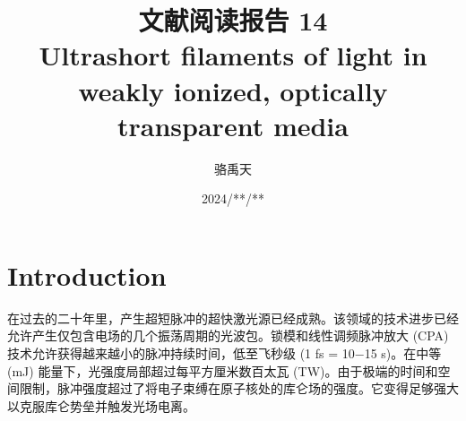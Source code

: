 \documentclass[14pt,a4paper,oneside]{article}
\title{\textbf{文献阅读报告 14\\Ultrashort filaments of light in weakly ionized, optically transparent media}\cite{bergeUltrashortFilamentsLight2007}}                           %
\author{骆禹天}                                           %
\date{2024/**/**}                                        %
\begin{document}

\maketitle

\setcounter{page}{1}          %


\tableofcontents              %

\newpage
\setcounter{page}{1}          %








\section{Introduction}

在过去的二十年里，产生超短脉冲的超快激光源已经成熟。该领域的技术进步已经允许产生仅包含电场的几个振荡周期的光波包。锁模和线性调频脉冲放大 (CPA) 技术允许获得越来越小的脉冲持续时间，低至飞秒级 (1 fs = 10−15 s)。在中等 (mJ) 能量下，光强度局部超过每平方厘米数百太瓦 (TW)。由于极端的时间和空间限制，脉冲强度超过了将电子束缚在原子核处的库仑场的强度。它变得足够强大以克服库仑势垒并触发光场电离。




\newpage

\clearpage           %




\end{document}
